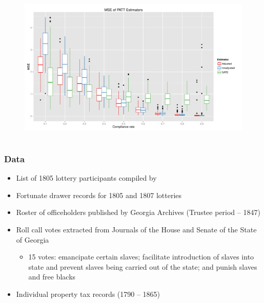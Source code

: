 \documentclass{beamer}
\begin{document}
\begin{frame}
\begin{figure}[htbp]
\centering
   \includegraphics[width=\linewidth]{../paper/mse_boxplots_B5.pdf} 
\label{simulation-plot}
\end{figure}
\end{frame}



\section[Data]{}

\begin{frame}
\frametitle{Data}
\begin{itemize}
\item List of 1805 lottery participants compiled by \citet{graham2005}
\item Fortunate drawer records for 1805 and 1807 lotteries \citep{graham2004,graham2011}
\item Roster of officeholders published by Georgia Archives (Trustee period -- 1847)
\item Roll call votes extracted from Journals of the House and Senate of the State of Georgia
\begin{itemize}
\item  15 votes: emancipate certain slaves; facilitate introduction of slaves into state and prevent slaves being carried out of the state; and punish slaves and free blacks
\end{itemize}
\item Individual property tax records (1790 -- 1865)  \citep{archives1890,blair1926}
\end{itemize}
\end{frame}
\end{document}
